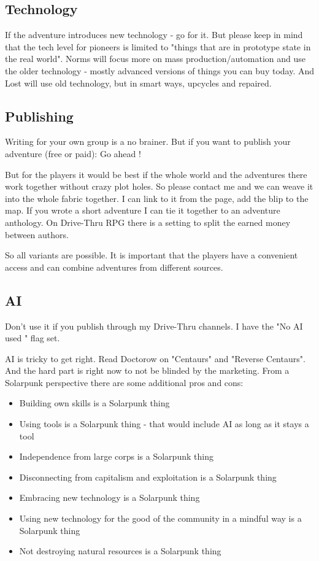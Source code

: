 \subsection{Technology}

If the adventure introduces new technology - go for it. But please keep in mind that the tech level for pioneers is limited to "things that are in prototype state in the real world". Norms will focus more on mass production/automation and use the older technology - mostly advanced versions of things you can buy today. And Lost will use old technology, but in smart ways, upcycles and repaired.

\subsection{Publishing}

Writing for your own group is a no brainer. But if you want to publish your adventure (free or paid): Go ahead !

But for the players it would be best if the whole world and the adventures there work together without crazy plot holes. So please contact me and we can weave it into the whole fabric together. I can link to it from the page, add the blip to the map. If you wrote a short adventure I can tie it together to an adventure anthology. On Drive-Thru RPG there is a setting to split the earned money between authors.

So all variants are possible. It is important that the players have a convenient access and can combine adventures from different sources.

\subsection{AI}

Don't use it if you publish through my Drive-Thru channels. I have the "No AI used " flag set.

AI is tricky to get right. Read Doctorow on "Centaurs" and "Reverse Centaurs". And the hard part is right now to not be blinded by the marketing. From a Solarpunk perspective there are some additional pros and cons:

\begin{itemize}
\item{Building own skills is a Solarpunk thing}
\item{Using tools is a Solarpunk thing - that would include AI as long as it stays a tool}
\item{Independence from large corps is a Solarpunk thing}
\item{Disconnecting from capitalism and exploitation is a Solarpunk thing}
\item{Embracing new technology is a Solarpunk thing}
\item{Using new technology for the good of the community in a mindful way is a Solarpunk thing}
\item{Not destroying natural resources is a Solarpunk thing}
\end{itemize}


